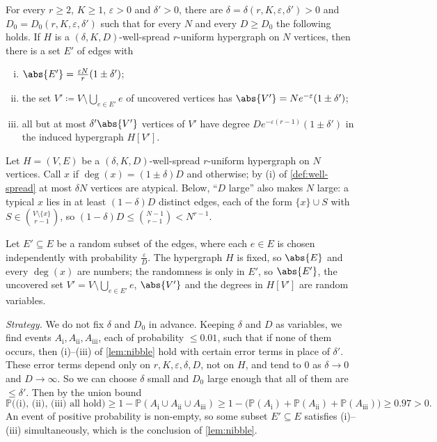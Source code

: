 \begin{recall}
    For every \(r \ge 2\), \(K \ge 1\), \(\varepsilon > 0\) and \(\delta' > 0\), there are \(\delta = \delta(r,K,\varepsilon,\delta') > 0\) and \(D_0 = D_0(r,K,\varepsilon,\delta')\) such that for every \(N\) and every \(D \ge D_0\) the following holds. If \(H\) is a \((\delta, K, D)\)-well-spread \(r\)-uniform hypergraph on \(N\) vertices, then there is a set \(E'\) of edges with
    \begin{enumerate}[(i)]
        \item \(\abs{E'} = \frac{\varepsilon N}{r} (1 \pm \delta')\);
        \item the set \(V' \coloneqq V \setminus \bigcup_{e \in E'} e\) of uncovered vertices has \(\abs{V'} = N e^{-\varepsilon} (1 \pm \delta')\);
        \item all but at most \(\delta' \abs{V'}\) vertices of \(V'\) have degree \(D e^{-\varepsilon(r-1)} (1 \pm \delta')\) in the induced hypergraph \(H[V']\).
    \end{enumerate}
\end{recall}

Let \(H = (V, E)\) be a \((\delta, K, D)\)-well-spread \(r\)-uniform hypergraph on \(N\) vertices. Call \(x\)  if \(\deg(x) = (1 \pm \delta) D\) and  otherwise; by (i) of \autoref{def:well-spread} at most \(\delta N\) vertices are atypical. Below, ``\(D\) large'' also makes \(N\) large: a typical \(x\) lies in at least \((1 - \delta)D\) distinct edges, each of the form \(\{x\} \cup S\) with \(S \in \binom{V \setminus \{x\}}{r-1}\), so \((1 - \delta) D \le \binom{N-1}{r-1} < N^{r-1}\).

Let \(E' \subseteq E\) be a random subset of the edges, where each \(e \in E\) is chosen independently with probability \(\frac{\varepsilon}{D}\). The hypergraph \(H\) is fixed, so \(\abs{E}\) and every \(\deg(x)\) are numbers; the randomness is only in \(E'\), so \(\abs{E'}\), the uncovered set \(V' = V \setminus \bigcup_{e \in E'} e\), \(\abs{V'}\) and the degrees in \(H[V']\) are random variables. 

\emph{Strategy.} We do not fix \(\delta\) and \(D_{0}\) in advance. Keeping \(\delta\) and \(D\) as variables, we find events \(A_{\mathrm{i}}, A_{\mathrm{ii}}, A_{\mathrm{iii}}\), each of probability \(\le 0.01\), such that if none of them occurs, then (i)--(iii) of \autoref{lem:nibble} hold with certain error terms in place of \(\delta'\). These error terms depend only on \(r, K, \varepsilon, \delta, D\), not on \(H\), and tend to \(0\) as \(\delta \to 0\) and \(D \to \infty\). So we can choose \(\delta\) small and \(D_{0}\) large enough that all of them are \(\le \delta'\). Then by the union bound
\[
    \mathbb{P}\bigl( \text{(i), (ii), (iii) all hold} \bigr) \ge 1 - \mathbb{P}(A_{\mathrm{i}} \cup A_{\mathrm{ii}} \cup A_{\mathrm{iii}}) \ge 1 - \bigl( \mathbb{P}(A_{\mathrm{i}}) + \mathbb{P}(A_{\mathrm{ii}}) + \mathbb{P}(A_{\mathrm{iii}}) \bigr) \ge 0.97 > 0 .
\]
An event of positive probability is non-empty, so some subset \(E' \subseteq E\) satisfies (i)--(iii) simultaneously, which is the conclusion of \autoref{lem:nibble}.


